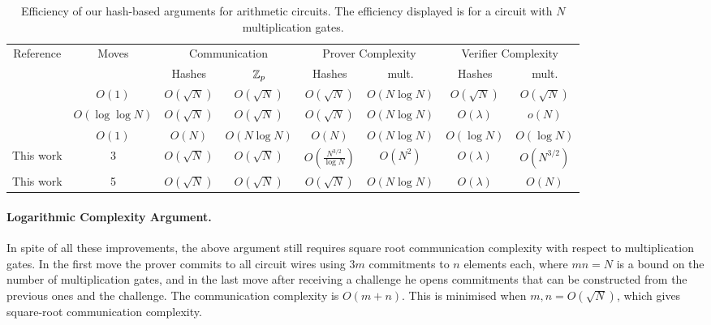 \begin{table}
\vspace{20mm}
\centering
\begin{tabular}{|c|c|cc|cc|cc|}
\hline
Reference & Moves &\multicolumn{2}{c|}{ Communication}&\multicolumn{2}{c|}{Prover Complexity}&\multicolumn{2}{c|}{Verifier Complexity}\\
&& Hashes & $\mathbb{Z}_p$ & Hashes & mult. & Hashes & mult. \\
\hline
\cite{CCS:AHIV17}& $O(1)$& $O(\sqrt{N})$  & $O(\sqrt{N})$ & $O(\sqrt{N})$ & $O(N\log N)$& $O(\sqrt{N})$ & $O(\sqrt{N})$ \\
\cite{BootleCGGHJ17}& $O(\log \log N)$ &$O(\sqrt{N})$&$O(\sqrt{N})$&$O(\sqrt{N})$ &$O\left(N \log N\right)$&$O(\lambda)$&$o(N)$ \\
\cite{Ben-SassonBHR18}& $O(1)$ &$O(N)$&$O(N \log N)$&$O(N)$ & $O(N \log N)$ &  $O(\log N)$&$O(\log N)$\\
\hline
This work & 3& $O(\sqrt{N})$&$O(\sqrt{N})$&$O(\frac{N^{3/2}}{\log{N}})$& $O(N^2)$ &$O(\lambda)$ & $O(N^{3/2})$ \\
\hline
This work & 5& $O(\sqrt{N})$&$O(\sqrt{N})$&$O(\sqrt{N})$& $O(N \log{N})$ &$O(\lambda)$ & $O(N)$ \\
\hline
\end{tabular}
\vspace{.2cm}
\caption{Efficiency of our hash-based arguments for arithmetic circuits. The efficiency displayed is for a circuit with $N$ multiplication gates.\label{table:previous2}} 
\vspace{-.5cm}
\end{table}

\paragraph{Logarithmic Complexity Argument.}
In spite of all these improvements, the above argument still requires square root communication complexity with respect to multiplication gates. In the first move the prover commits to all circuit wires using $3m$ commitments to $n$ elements each, where $mn=N$ is a bound on the number of multiplication gates, and in the last move after receiving a challenge he opens commitments that can be constructed from the previous ones and the challenge. The communication complexity is $O(m+n)$. This is minimised when $m, n = O(\sqrt{N})$, which gives square-root communication complexity.

